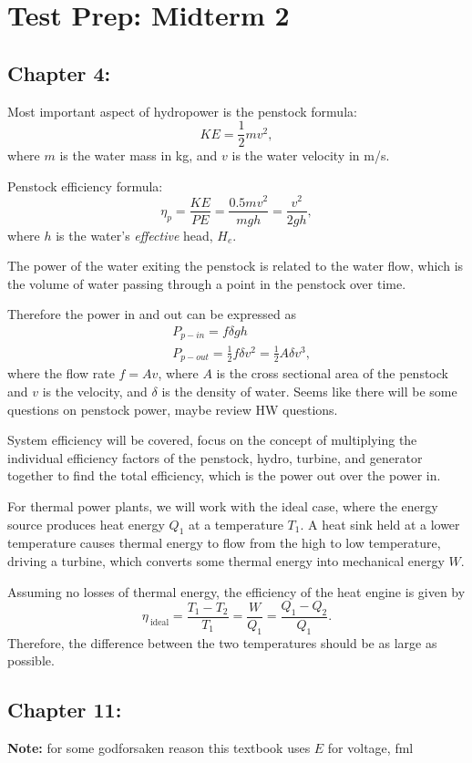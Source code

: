 \documentclass{article}
\begin{document}
\section{Test Prep: Midterm 2}
\subsection{Chapter 4:}
Most important aspect of hydropower is the penstock formula:
\[
  KE = \frac{1}{2}mv^2,
\]
where \(m\) is the water mass in kg, and \(v\) is the water velocity in m/s.

Penstock efficiency formula:
\[
  \eta_p = \frac{KE}{PE} = \frac{0.5mv^2}{mgh} = \frac{v^2}{2gh},
\]
where \(h\) is the water's \textit{effective} head, \(H_e\).

The power of the water exiting the penstock is related to the water flow, which is the volume of water passing through a point in the penstock over time.

Therefore the power in and out can be expressed as
\begin{align*}
	&P_{p-in} = f\delta gh \\
	&P_{p-out} = \frac{1}{2}f\delta v^2 = \frac{1}{2}A\delta v^3,
\end{align*}
where the flow rate \(f = Av\), where \(A\) is the cross sectional area of the penstock and \(v\) is the velocity, and \(\delta\) is the density of water. Seems like there will be some questions on penstock power, maybe review HW questions.

System efficiency will be covered, focus on the concept of multiplying the individual efficiency factors of the penstock, hydro, turbine, and generator together to find the total efficiency, which is the power out over the power in.

For thermal power plants, we will work with the ideal case, where the energy source produces heat energy \(Q_1\) at a temperature \(T_1\). A heat sink held at a lower temperature causes thermal energy to flow from the high to low temperature, driving a turbine, which converts some thermal energy into mechanical energy \(W\).

Assuming no losses of thermal energy, the efficiency of the heat engine is given by
\[
	\eta_{ \ \mathrm{ideal}} = \frac{T_1 - T_2}{T_1} = \frac{W}{Q_1} = \frac{Q_1 - Q_2}{Q_1}.
\]
Therefore, the difference between the two temperatures should be as large as possible.
\subsection{Chapter 11:}
\textbf{Note:} for some godforsaken reason this textbook uses \(E\) for voltage, fml
\end{document}
